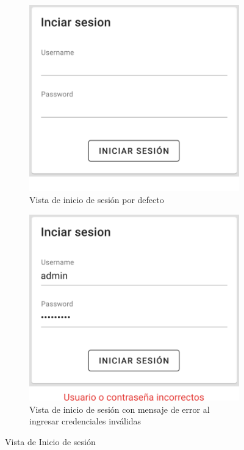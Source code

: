 \begin{itemize}
\begin{figure}[ht]
    \centering
    \begin{subfigure}[b]{0.45\textwidth}
        \centering
        \includegraphics[width=\textwidth]{images/app/login.png}
        \caption{Vista de inicio de sesión por defecto \newline}
        \label{fig:app-login_default}
    \end{subfigure}
    \hfill
    \begin{subfigure}[b]{0.45\textwidth}
        \centering
        \includegraphics[width=\textwidth]{images/app/login-error.png}
        \caption{Vista de inicio de sesión con mensaje de error al ingresar credenciales inválidas}
        \label{fig:app-login_error}
    \end{subfigure}
    \caption{Vista de Inicio de sesión}
    \label{fig:app-login}
\end{figure}


\end{itemize}
